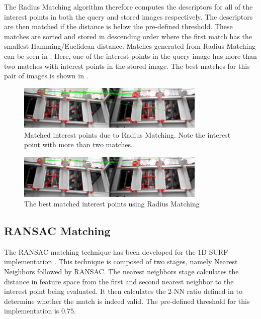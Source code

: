 \documentclass[11pt]{report}
\begin{document}
The Radius Matching algorithm therefore computes the descriptors for all of the interest points in both the query and stored images respectively. The descriptors are then matched if the distance is below the pre-defined threshold. These matches are sorted and stored in descending order where the first match has the smallest Hamming/Euclidean distance. Matches generated from Radius Matching can be seen in . Here, one of the interest points in the query image has more than two matches with interest points in the stored image. The best matches for this pair of images is shown in .\\ 


 \begin{figure}[h!] 
  \centering
    \includegraphics[width=0.8\textwidth]{../Drawings/Matching/feature_matching/dataset1_without_validation_radius.jpg}
    \caption{Matched interest points due to Radius Matching. Note the interest point with more than two matches.}
    \label{fig:radius_match}
\end{figure}

 \begin{figure}[h!] 
  \centering
    \includegraphics[width=0.8\textwidth]{../Drawings/Matching/feature_matching/dataset1_without_validation_radius_best.jpg}
    \caption{The best matched interest points using Radius Matching}
    \label{fig:radius_best_match}
\end{figure}

\subsection{RANSAC Matching}
\label{sec:ransacMatching}
The RANSAC matching technique has been developed for the 1D SURF implementation \cite{Anderson}. This technique is composed of two stages, namely Nearest Neighbors followed by RANSAC. The nearest neighbors stage calculates the distance in feature space from the first and second nearest neighbor to the interest point being evaluated. It then calculates the 2-NN ratio defined in  to determine whether the match is indeed valid. The pre-defined threshold for this implementation is $0.75$.\\
\end{document}
